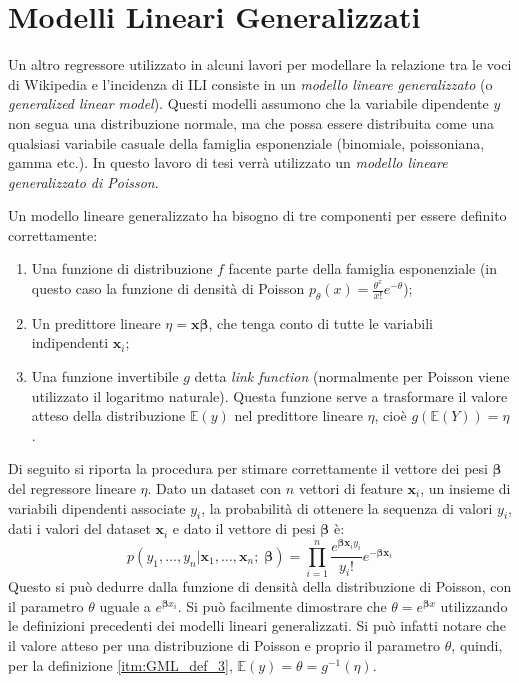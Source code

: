 \section{Modelli Lineari Generalizzati}
\bigskip

Un altro regressore utilizzato in alcuni lavori \cite{McIver2014} per modellare la relazione tra le voci di Wikipedia e l'incidenza di ILI consiste 
in un \textit{modello lineare generalizzato}\cite{GLM} (o \textit{generalized linear model}). Questi modelli assumono che la variabile 
dipendente $y$ non segua una distribuzione normale, ma che possa essere distribuita come una qualsiasi variabile casuale 
della famiglia esponenziale (binomiale, poissoniana, gamma etc.). In questo lavoro di tesi verrà utilizzato un 
\textit{modello lineare generalizzato di Poisson}. 
\bigskip
 
Un modello lineare generalizzato ha bisogno di tre componenti per essere definito correttamente:
\begin{enumerate}
\item Una funzione di distribuzione $f$ facente parte della famiglia esponenziale (in questo caso la funzione di densità di Poisson $p_{\theta}(x) = \frac{\theta^{x}}{x!}e^{-\theta}$);
\item Un predittore lineare $\eta = \bm{x\beta}$, che tenga conto di tutte le variabili indipendenti $\bm{x}_i$;
\item Una funzione invertibile $g$ detta \textit{link function} (normalmente per Poisson viene utilizzato il logaritmo naturale). Questa funzione serve a trasformare il valore atteso della distribuzione $\mathbb{E}(y)$ nel predittore lineare $\eta$, cioè $g(\mathbb{E}(Y)) = \eta$ \label{itm:GML_def_3}.
\end{enumerate}

Di seguito si riporta la procedura per stimare correttamente il vettore dei pesi $\bm{\beta}$ del regressore lineare $\eta$. 
Dato un dataset con $n$ vettori di feature $\bm{x}_i$, un insieme di variabili dipendenti 
associate $y_i$, la probabilità di ottenere la sequenza di valori $y_i$, dati i valori del dataset $\bm{x}_i$ e dato il vettore di pesi $\bm{\beta}$ è:
\begin{equation}
p(y_1,\ldots,y_n | \bm{x}_1,\ldots,\bm{x}_n; \; \bm{\beta}) = \prod_{i=1}^n \frac{e^{\bm{\beta}\bm{x}_iy_i}}{y_i!}e^{-\bm{\beta}\bm{x}_i} \label{eq:GLM_Poisson}
\end{equation}
Questo si può dedurre dalla funzione di densità della distribuzione di Poisson, con il parametro $\theta$ uguale a $e^{\bm{\beta}x_i}$. Si può facilmente dimostrare che $\theta=e^{\bm{\beta}x}$ utilizzando le definizioni precedenti dei modelli lineari generalizzati. Si può infatti notare che il valore atteso per una distribuzione di Poisson e proprio il parametro $\theta$, quindi, per la definizione \ref{itm:GML_def_3}, $\mathbb{E}(y) = \theta = g^{-1}(\eta)$.
\bigskip

